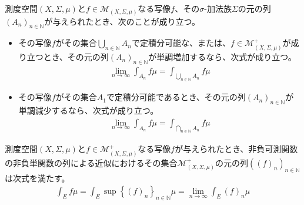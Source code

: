 \documentclass[dvipdfmx]{jsarticle}
\begin{document}
\begin{thm*}
測度空間$(X,\varSigma,\mu)$と$f \in \mathcal{M}_{(X,\varSigma,\mu)}$なる写像$f$、その$\sigma$-加法族$\varSigma$の元の列$\left( A_{n} \right)_{n \in \mathbb{N}}$が与えられたとき、次のことが成り立つ。
\begin{itemize}
\item
  その写像$f$がその集合$\bigcup_{n \in \mathbb{N}} A_{n}$で定積分可能な、または、$f \in \mathcal{M}_{(X,\varSigma,\mu)}^{+}$が成り立つとき、その元の列$\left( A_{n} \right)_{n \in \mathbb{N}}$が単調増加するなら、次式が成り立つ。
\begin{align*}
\lim_{n \rightarrow \infty}{\int_{A_{n}} {f\mu}} = \int_{\bigcup_{n \in \mathbb{N}} A_{n}} {f\mu}
\end{align*}
\item
  その写像$f$がその集合$A_{1}$で定積分可能であるとき、その元の列$\left( A_{n} \right)_{n \in \mathbb{N}}$が単調減少するなら、次式が成り立つ。
\begin{align*}
\lim_{n \rightarrow \infty}{\int_{A_{n}} {f\mu}} = \int_{\bigcap_{n \in \mathbb{N}} A_{n}} {f\mu}
\end{align*}
\end{itemize}
\end{thm*}
\begin{thm*}
測度空間$(X,\varSigma,\mu)$と$f \in \mathcal{M}_{(X,\varSigma,\mu)}^{+}$なる写像$f$が与えられたとき、非負可測関数の非負単関数の列による近似におけるその集合$\mathcal{M}_{(X,\varSigma,\mu)}^{+}$の元の列$\left( (f)_{n} \right)_{n \in \mathbb{N}}$は次式を満たす。
\begin{align*}
\int_{E} {f\mu} = \int_{E} {\sup\left\{ (f)_{n} \right\}_{n \in \mathbb{N}}\mu} = \lim_{n \rightarrow \infty}{\int_{E} {(f)_{n}\mu}}
\end{align*}
\end{thm*}
\end{document}
